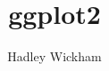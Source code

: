 \documentclass[letterpaper]{scrbook}
\title{ggplot2}
\author{Hadley Wickham}
\begin{document}
\fi
\end{document}

